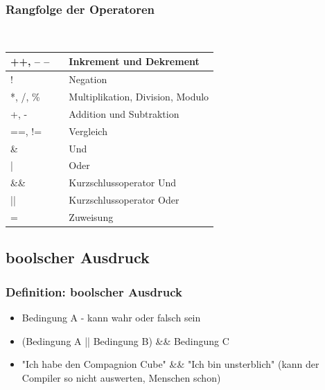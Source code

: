 \documentclass[final]{beamer}
\begin{document}
\begin{frame}
	\frametitle{Rangfolge der Operatoren}
	\\
	\begin{center}
	\begin{tabular}{|l c | l|}
	 \hline
		++, -- --  & &  Inkrement und Dekrement \\
		 \hline
		! & & Negation \\ \hline
		
		*, /, \% & & Multiplikation, Division, Modulo \\ \hline
		+, - & & Addition und Subtraktion \\ \hline
		==, != & & Vergleich \\ \hline
		\& & & Und \\ \hline
		| & & Oder \\ \hline
		\&\& & & Kurzschlussoperator Und \\ \hline
		|| & & Kurzschlussoperator Oder \\ \hline
		= & & Zuweisung \\
		 \hline
	\end{tabular}
	\end{center}
\end{frame}

\subsection{boolscher Ausdruck} 
\begin{frame}
	\frametitle{Definition: boolscher Ausdruck}
	\begin{itemize}
		\item{Bedingung A - kann wahr oder falsch sein}
		\item{(Bedingung A || Bedingung B) \&\& Bedingung C}
		\item{"Ich habe den Compagnion Cube" \&\& "Ich bin unsterblich" (kann der Compiler so nicht auswerten, Menschen schon)}
	\end{itemize}
\end{frame}
\end{document}
